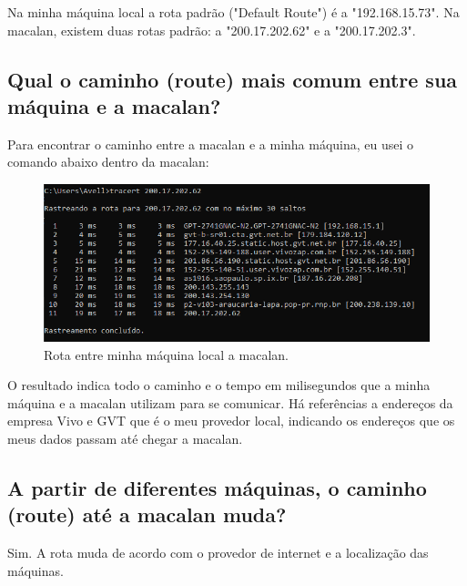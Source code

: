 \documentclass{article}
\begin{document}
Na minha máquina local a rota padrão ("Default Route") é a "192.168.15.73". Na macalan, existem duas rotas padrão: a "200.17.202.62" e a "200.17.202.3".


\subsection{Qual o caminho (route) mais comum entre sua máquina e a macalan?}

Para encontrar o caminho entre a macalan e a minha máquina, eu usei o comando abaixo dentro da macalan:

\begin{figure}
    \includegraphics[width=\linewidth]{local_to_macalan_route.PNG}
    \caption{Rota entre minha máquina local a macalan.}
\end{figure}

O resultado indica todo o caminho e o tempo em milisegundos que a minha máquina e a macalan utilizam para se comunicar.
Há referências a endereços da empresa Vivo e GVT que é o meu provedor local, indicando os endereços que os meus dados passam até chegar a macalan.

\subsection{A partir de diferentes máquinas, o caminho (route) até a macalan muda?}

Sim. A rota muda de acordo com o provedor de internet e a localização das máquinas.
\end{document}
